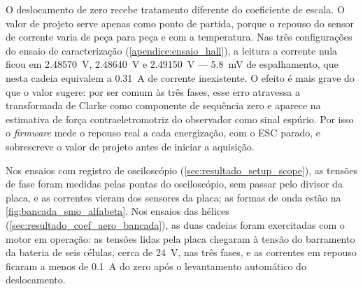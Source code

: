 O deslocamento de zero recebe tratamento diferente do coeficiente de escala.
O valor de projeto serve apenas como ponto de partida, porque o repouso do
sensor de corrente varia de peça para peça e com a temperatura. Nas três
configurações do ensaio de caracterização (\autoref{apendice:ensaio_hall}), a
leitura a corrente nula ficou em \SI{2,48570}{\volt}, \SI{2,48640}{\volt} e
\SI{2,49150}{\volt} --- \SI{5,8}{\milli\volt} de espalhamento, que nesta
cadeia equivalem a \SI{0,31}{\ampere} de corrente inexistente. O efeito é
mais grave do que o valor sugere: por ser comum às três fases, esse erro
atravessa a transformada de Clarke como componente de sequência zero e
aparece na estimativa de força contraeletromotriz do observador como sinal
espúrio. Por isso o \textit{firmware} mede o repouso real a cada
energização, com o ESC parado, e sobrescreve o valor de projeto antes de
iniciar a aquisição.

Nos ensaios com registro de osciloscópio
(\autoref{sec:resultado_setup_scope}), as tensões de fase foram medidas pelas
pontas do osciloscópio, sem passar pelo divisor da placa, e as correntes vieram
dos sensores da placa; as formas de onda estão na
\autoref{fig:bancada_smo_alfabeta}. Nos ensaios das hélices
(\autoref{sec:resultado_coef_aero_bancada}), as duas cadeias foram exercitadas
com o motor em operação: as tensões lidas pela placa chegaram à tensão do
barramento da bateria de seis células, cerca de \SI{24}{\volt}, nas três fases,
e as correntes em repouso ficaram a menos de \SI{0,1}{\ampere} do zero após o
levantamento automático do deslocamento.
